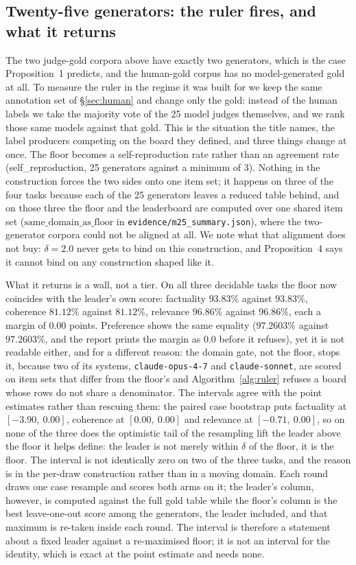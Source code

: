\documentclass{article}
\newcommand{\ids}[1]{\texttt{\small #1}} %
\begin{document}
\subsection{Twenty-five generators: the ruler fires, and what it returns}
\label{sec:m25}\label{sec:imposedgold}
The two judge-gold corpora above have exactly two generators, which is the case Proposition~1 predicts, and the
human-gold corpus has no model-generated gold at all. To measure the ruler in the regime it was built for we keep
the same annotation set of \S\ref{sec:human} and change only the gold: instead of the human labels we take the
majority vote of the 25 model judges themselves, and we rank those same models against that
gold. This is the situation the title names, the label producers competing on the board they defined, and three
things change at once. The floor becomes a self-reproduction rate rather than an agreement rate
(self\_reproduction, 25 generators against a minimum of 3). Nothing in the construction forces the two sides
onto one item set; it happens on three of the four tasks because each of the 25 generators leaves a reduced
table behind, and on those three the floor and the leaderboard are computed over one shared item set
($\mathrm{same\_domain\_as\_floor}$ in \ids{evidence/m25\_summary.json}), where the
two-generator corpora could not be aligned at all. We note what that alignment does not buy: $\delta = 2.0$ never gets to bind on this construction, and
Proposition~4 says it cannot bind on any construction shaped like it.

What it returns is a wall, not a tier. On all three decidable tasks the floor now coincides with the leader's
own score: factuality $93.83\%$ against $93.83\%$, coherence $81.12\%$ against $81.12\%$, relevance
$96.86\%$ against $96.86\%$, each a margin of $0.00$ points. Preference shows the same equality
($97.2603\%$ against $97.2603\%$, and the report prints the margin as $0.0$ before it refuses), yet it is not
readable either, and for a different reason: the domain gate, not the floor, stops it, because two of its
systems, \ids{claude-opus-4-7} and \ids{claude-sonnet}, are scored on item sets that differ from the floor's
and Algorithm~\ref{alg:ruler} refuses a board whose rows do not share a denominator. The intervals agree with the point estimates rather than rescuing them: the paired case bootstrap puts
factuality at $[-3.90,\ 0.00]$, coherence at $[0.00,\ 0.00]$ and relevance at $[-0.71,\ 0.00]$, so on none of
the three does the optimistic tail of the resampling lift the leader above the floor it helps define: the leader is
not merely within $\delta$ of the floor, it is the floor. The interval is not identically zero on two of the three tasks, and the reason is in the per-draw construction rather than in a moving domain. Each round draws one case resample and scores both arms on it; the leader's column, however, is computed against the full gold table while the floor's column is the best leave-one-out score among the generators, the leader included, and that maximum is re-taken inside each round. The interval is therefore a statement about a fixed leader against a re-maximised floor; it is not an interval for the identity, which is exact at the point estimate and needs none. 
\end{document}

